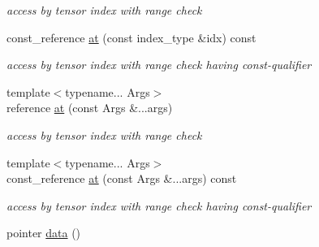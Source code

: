\begin{DoxyCompactItemize}
\begin{DoxyCompactList}\small\item\em access by tensor index with range check \item\end{DoxyCompactList}\item 
\hypertarget{classbtas_1_1_tensor_a061b027680ac3b82aff520c0affc7b77}{
const\_\-reference \hyperlink{classbtas_1_1_tensor_a061b027680ac3b82aff520c0affc7b77}{at} (const index\_\-type \&idx) const }
\label{classbtas_1_1_tensor_a061b027680ac3b82aff520c0affc7b77}

\begin{DoxyCompactList}\small\item\em access by tensor index with range check having const-\/qualifier \item\end{DoxyCompactList}\item 
\hypertarget{classbtas_1_1_tensor_a16f72a734145aeb179ac8939df8c8f28}{
{\footnotesize template$<$typename... Args$>$ }\\reference \hyperlink{classbtas_1_1_tensor_a16f72a734145aeb179ac8939df8c8f28}{at} (const Args \&...args)}
\label{classbtas_1_1_tensor_a16f72a734145aeb179ac8939df8c8f28}

\begin{DoxyCompactList}\small\item\em access by tensor index with range check \item\end{DoxyCompactList}\item 
\hypertarget{classbtas_1_1_tensor_ab049d38027d058c3226ef5279c35d253}{
{\footnotesize template$<$typename... Args$>$ }\\const\_\-reference \hyperlink{classbtas_1_1_tensor_ab049d38027d058c3226ef5279c35d253}{at} (const Args \&...args) const }
\label{classbtas_1_1_tensor_ab049d38027d058c3226ef5279c35d253}

\begin{DoxyCompactList}\small\item\em access by tensor index with range check having const-\/qualifier \item\end{DoxyCompactList}\item 
\hypertarget{classbtas_1_1_tensor_ad6ac08b5dc758fdeba157bd8d1f45bf6}{
pointer \hyperlink{classbtas_1_1_tensor_ad6ac08b5dc758fdeba157bd8d1f45bf6}{data} ()}
\label{classbtas_1_1_tensor_ad6ac08b5dc758fdeba157bd8d1f45bf6}


\end{DoxyCompactItemize}
